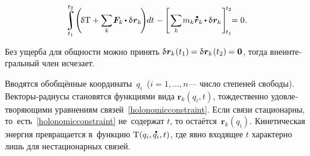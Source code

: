 \begin{otherlanguage}{russian}
\nopagebreak\vspace{-0.25em}\begin{equation}
\displaystyle \integral\displaylimits_{t_1}^{\raisemath{.12em}{t_2}}
\hspace{-0.4ex}
\left( \hspace{-0.32ex} \variation{\mathrm{T}}
+ \scalebox{0.95}[0.98]{$ \displaystyle \sum_{\smash{k}} $} \hspace{.16ex} \bm{F}_k \hspace{-0.1ex} \dotp \variation{\hspace{.1ex}\bm{r}_k} \hspace{-0.32ex} \right) \hspace{-0.5ex} dt \hspace{.16ex}
- \hspace{-0.1ex} \left[ \hspace{.2ex} \scalebox{0.95}[0.98]{$ \displaystyle \sum_{\smash{k}} $} \hspace{.2ex} m_k \mathdotabove{\bm{r}}_k \hspace{-0.1ex} \dotp \variation{\hspace{.1ex}\bm{r}_k} \hspace{.16ex} \right]_{\hspace{-0.32ex}t_1}^{\hspace{-0.32ex}t_2}
\hspace{-0.8ex} = 0 \hspace{.1ex} .
\end{equation}

\vspace{-0.16em} \noindent Без ущерба для общности можно принять ${\variation{\hspace{.1ex}\bm{r}_k}\hspace{.1ex}(t_1) \hspace{-0.1ex} = \variation{\hspace{.1ex}\bm{r}_k}\hspace{.1ex}(t_2) \hspace{-0.1ex} = \bm{0}}$, тогда внеинтегральный член исчезает.

Вводятся обобщённые координаты~$q_i$~(${i = 1, \ldots, n}$\:--- число степеней свободы). Векторы-радиусы становятся функциями \hbox{вида} ${\bm{r}_k(q_i, t)}$, тождественно удовлетворяющими уравнениям связей~\eqref{holonomicconstraint}. Если связи стационарны, то~есть~\eqref{holonomicconstraint} не~содержат $t$, то остаётся~${\bm{r}_k(q_i)}$. Кинетическая энергия превращается в~функцию ${\mathrm{T}(q_i, \mathdotabove{q}_i, t)}$, где явно входящее $t$ характерно лишь для нестационарных связей.


\end{otherlanguage}
